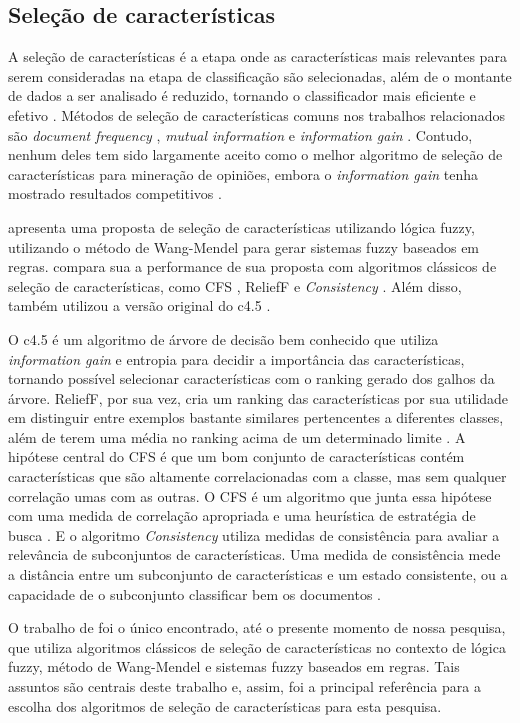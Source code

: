 \documentclass[template.tex]{subfiles}
\begin{document}
\subsection{Seleção de características}

A seleção de características é a etapa onde as características mais relevantes para serem consideradas na etapa de classificação são selecionadas, além de o montante de dados a ser analisado é reduzido, tornando o classificador mais eficiente e efetivo \cite{moraes2012document}. Métodos de seleção de características comuns nos trabalhos relacionados são \textit{document frequency} \cite{pang2002thumbs}, \textit{mutual information} \cite{turney2002thumbs} e \textit{information gain} \cite{wiebe2006word}. Contudo, nenhum deles tem sido largamente aceito como o melhor algoritmo de seleção de características para mineração de opiniões, embora o \textit{information gain} tenha mostrado resultados competitivos \cite{moraes2012document}.

\cite{cintra2008fuzzy} apresenta uma proposta de seleção de características utilizando lógica fuzzy, utilizando o método de Wang-Mendel \cite{wang1992generating} para gerar sistemas fuzzy baseados em regras. \cite{cintra2008fuzzy} compara sua a performance de sua proposta com algoritmos clássicos de seleção de características, como CFS \cite{hall1999correlation}, ReliefF \cite{kira1992practical} e \textit{Consistency} \cite{liu1996probabilistic}. Além disso, também utilizou a versão original do c4.5 \cite{salzberg1994c4}. 

O c4.5 é um algoritmo de árvore de decisão bem conhecido que utiliza \textit{information gain} e entropia para decidir a importância das características, tornando possível selecionar características com o ranking gerado dos galhos da árvore. ReliefF, por sua vez, cria um ranking das características por sua utilidade em distinguir entre exemplos bastante similares pertencentes a diferentes classes, além de terem uma média no ranking acima de um determinado limite \cite{cintra2008fuzzy}. A hipótese central do CFS é que um bom conjunto de características contém características que são altamente correlacionadas com a classe, mas sem qualquer correlação umas com as outras. O CFS é um algoritmo que junta essa hipótese com uma medida de correlação apropriada e uma heurística de estratégia de busca \cite{hall1999correlation}. E o algoritmo \textit{Consistency} utiliza medidas de consistência para avaliar a relevância de subconjuntos de características. Uma medida de consistência  mede a distância entre um subconjunto de características e um estado consistente, ou a capacidade de o subconjunto classificar bem os documentos \cite{liu1996probabilistic}.

O trabalho de \cite{cintra2008fuzzy} foi o único encontrado, até o presente momento de nossa pesquisa, que utiliza algoritmos clássicos de seleção de características no contexto de lógica fuzzy, método de Wang-Mendel e sistemas fuzzy baseados em regras. Tais assuntos são centrais deste trabalho e, assim, \cite{cintra2008fuzzy} foi a principal referência para a escolha dos algoritmos de seleção de características para esta pesquisa.



\end{document}
